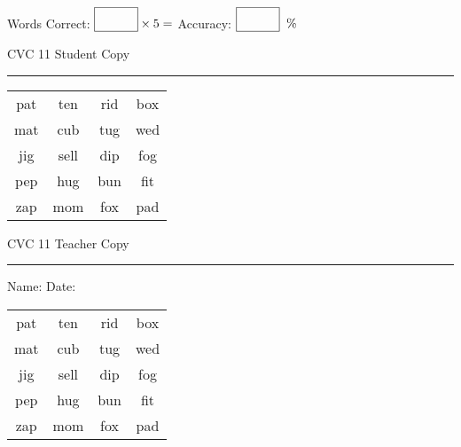 \documentclass{memoir}
\begin{document}
\normalsize

Words Correct: $\fbox{\phantom{\huge 100}} \times 5 = $ Accuracy: $\fbox{\phantom{\huge 100}}\;\; \%$ 

\vfill

\newpage


\footnotesize \noindent
CVC 11 \hfill Student Copy
\smallskip
\hrule

\huge

\setlength{\tabcolsep}{14pt}
\def\arraystretch{2}

{\selectfont


\begin{vplace}[0.5]
\begin{center}
\begin{tabular}{cccc}
pat & ten & rid & box \\
mat & cub & tug & wed \\
jig & sell & dip & fog \\
pep & hug & bun & fit \\
zap & mom & fox & pad \\
\end{tabular}
\end{center}
\end{vplace}

}

\newpage

\footnotesize \noindent
CVC 11 \hfill Teacher Copy
\smallskip
\hrule

\normalsize

\vfill

\noindent
Name: \underline{\hspace{1.75in}} \hfill Date: \underline{\hspace{1in}}

\huge

{\selectfont


\begin{vplace}[0.5]
\begin{center}
\begin{tabular}{cccc}
pat & ten & rid & box \\
mat & cub & tug & wed \\
jig & sell & dip & fog \\
pep & hug & bun & fit \\
zap & mom & fox & pad \\
\end{tabular}
\end{center}
\end{vplace}



}
\end{document}
